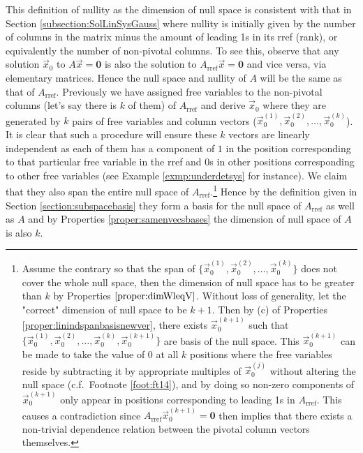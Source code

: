 This definition of nullity as the dimension of null space is consistent with that in Section \ref{subsection:SolLinSysGauss} where nullity is initially given by the number of columns in the matrix minus the amount of leading 1s in its rref (rank), or equivalently the number of non-pivotal columns. To see this, observe that any solution $\vec{x}_0$ to $A\vec{x} = \textbf{0}$ is also the solution to $A_{\text{rref}}\vec{x} = \textbf{0}$ and vice versa, via elementary matrices. Hence the null space and nullity of $A$ will be the same as that of $A_{\text{rref}}$. Previously we have assigned free variables to the non-pivotal columns (let's say there is $k$ of them) of $A_{\text{rref}}$ and derive $\vec{x}_0$ where they are generated by $k$ pairs of free variables and column vectors ($\vec{x}_0^{(1)}, \vec{x}_0^{(2)}, \ldots, \vec{x}_0^{(k)}$). It is clear that such a procedure will ensure these $k$ vectors are linearly independent as each of them has a component of $1$ in the position corresponding to that particular free variable in the rref and $0$s in other positions corresponding to other free variables (see Example \ref{exmp:underdetsys} for instance). We claim that they also span the entire null space of $A_{\text{rref}}$.\footnote{Assume the contrary so that the span of $\{\vec{x}_0^{(1)}, \vec{x}_0^{(2)}, \ldots, \vec{x}_0^{(k)}\}$ does not cover the whole null space, then the dimension of null space has to be greater than $k$ by Properties $\ref{proper:dimWleqV}$. Without loss of generality, let the "correct" dimension of null space to be $k+1$. Then by (c) of Properties \ref{proper:linindspanbasisnewver}, there exists $\vec{x}_0^{(k+1)}$ such that $\{\vec{x}_0^{(1)}, \vec{x}_0^{(2)}, \ldots, \vec{x}_0^{(k)}, \vec{x}_0^{(k+1)}\}$ are basis of the null space. This $\vec{x}_0^{(k+1)}$ can be made to take the value of $0$ at all $k$ positions where the free variables reside by subtracting it by appropriate multiples of $\vec{x}_0^{(j)}$ without altering the null space (c.f.\ Footnote \ref{foot:ft14}), and by doing so non-zero components of $\vec{x}_0^{(k+1)}$ only appear in positions corresponding to leading 1s in $A_{\text{rref}}$. This causes a contradiction since $A_{\text{rref}}\vec{x}_0^{(k+1)} = \textbf{0}$ then implies that there exists a non-trivial dependence relation between the pivotal column vectors themselves.} Hence by the definition given in Section \ref{section:subspacebasis} they form a basis for the null space of $A_{\text{rref}}$ as well as $A$ and by Properties \ref{proper:samenvecsbases} the dimension of null space of $A$ is also $k$.

